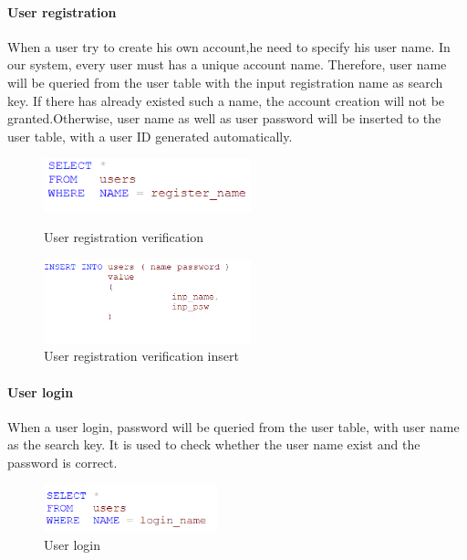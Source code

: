 \begin{CJK*}{UTF8}{gbsn}
\paragraph{User registration}
When a user try to create his own account,he need to specify his user name. In our system, every user must has a unique account name. Therefore, user name will be queried from the user table with the input registration name as search key. If there has already existed such a name, the account creation will not be granted.Otherwise, user name as well as user password will be inserted to the user table, with a user ID generated automatically.



\begin{figure}[htbp]
\centering
\label{reg_ver}
\begin{minipage}[t]{0.45\textwidth}
\centering
\includegraphics[width=6cm]{reg_ver.png}
\caption{User registration verification}
\end{minipage}
\begin{minipage}[t]{0.45\textwidth}
\centering
\includegraphics[width=6cm]{reg_ins.png}
\caption{User registration verification insert}
\end{minipage}
\end{figure}


\paragraph{User login}
When a user login, password will be queried from the user table, with user name as the search key. It is used to check whether the user name exist and the password is correct.


\begin{figure}[h]
    \label{login}
    \centering
    \includegraphics[width=0.45\textwidth]{login.png}
    \caption{User login}
\end{figure}


\end{CJK*}
